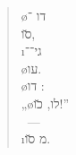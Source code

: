 \begin{verse}
	\o{דו} ־\\
	\u{סו},\\
	\i{גי}־־\\
	\o{עו}.\\
	\o{דו} :\\
	„\o{לו}, \u{כו}!”\\
	~—\\
	\i{מ} \u{סו}.
\end{verse}
